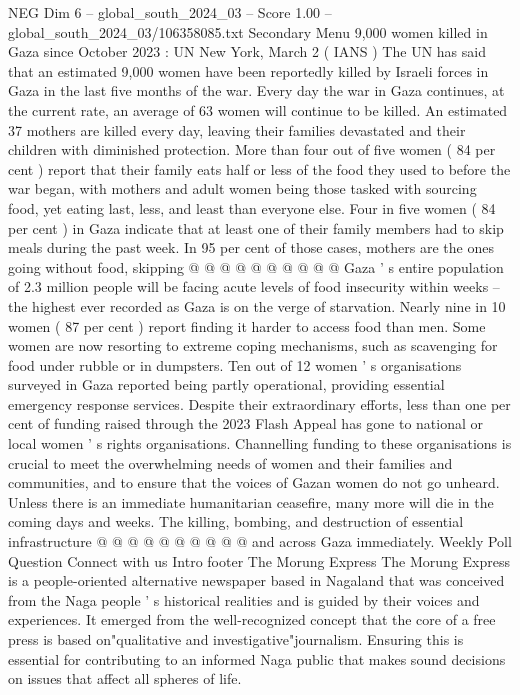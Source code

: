 \begin{textsample}{NEG Dim 6 – global\_south\_2024\_03 – Score 1.00 – global\_south\_2024\_03/106358085.txt}  \label{ex:f6_neg_393}
Secondary Menu 9,000 women killed in Gaza since October 2023 : UN New York, March 2 ( IANS ) The UN has said that an estimated 9,000 women have been reportedly killed by Israeli forces in Gaza in the last five months of the war.
Every day the war in Gaza continues, at the current rate, an average of 63 women will continue to be killed.
An estimated 37 mothers are killed every day, leaving their families devastated and their children with diminished protection.
More than four out of five women ( 84 per cent ) report that their family eats half or less of the food they used to before the war began, with mothers and adult women being those tasked with sourcing food, yet eating last, less, and least than everyone else.
Four in five women ( 84 per cent ) in Gaza indicate that at least one of their family members had to skip meals during the past week.
In 95 per cent of those cases, mothers are the ones going without food, skipping @ @ @ @ @ @ @ @ @ @ Gaza ' s entire population of 2.3 million people will be facing acute levels of food insecurity within weeks -- the highest ever recorded as Gaza is on the verge of starvation.
Nearly nine in 10 women ( 87 per cent ) report finding it harder to access food than men.
Some women are now resorting to extreme coping mechanisms, such as scavenging for food under rubble or in dumpsters.
Ten out of 12 women ' s organisations surveyed in Gaza reported being partly operational, providing essential emergency response services.
Despite their extraordinary efforts, less than one per cent of funding raised through the 2023 Flash Appeal has gone to national or local women ' s rights organisations.
Channelling funding to these organisations is crucial to meet the overwhelming needs of women and their families and communities, and to ensure that the voices of Gazan women do not go unheard.
Unless there is an immediate humanitarian ceasefire, many more will die in the coming days and weeks.
The killing, bombing, and destruction of essential infrastructure @ @ @ @ @ @ @ @ @ @ and across Gaza immediately.
Weekly Poll Question Connect with us Intro footer The Morung Express The Morung Express is a people-oriented alternative newspaper based in Nagaland that was conceived from the Naga people ' s historical realities and is guided by their voices and experiences.
It emerged from the well-recognized concept that the core of a free press is based on"qualitative and investigative"journalism.
Ensuring this is essential for contributing to an informed Naga public that makes sound decisions on issues that affect all spheres of life.

\end{textsample}
